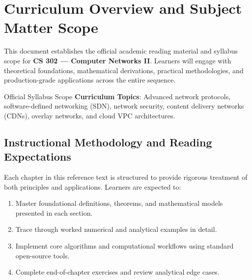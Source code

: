 \section{Curriculum Overview and Subject Matter Scope}

This document establishes the official academic reading material and syllabus scope for \textbf{CS 302 --- Computer Networks II}. Learners will engage with theoretical foundations, mathematical derivations, practical methodologies, and production-grade applications across the entire sequence.

\begin{InsightBox}{Official Syllabus Scope}
  \textbf{Curriculum Topics}: Advanced network protocols, software-defined networking (SDN), network security, content delivery networks (CDNs), overlay networks, and cloud VPC architectures.
\end{InsightBox}

\subsection{Instructional Methodology and Reading Expectations}

Each chapter in this reference text is structured to provide rigorous treatment of both principles and applications. Learners are expected to:
\begin{enumerate}
  \item Master foundational definitions, theorems, and mathematical models presented in each section.
  \item Trace through worked numerical and analytical examples in detail.
  \item Implement core algorithms and computational workflows using standard open-source tools.
  \item Complete end-of-chapter exercises and review analytical edge cases.
\end{enumerate}

